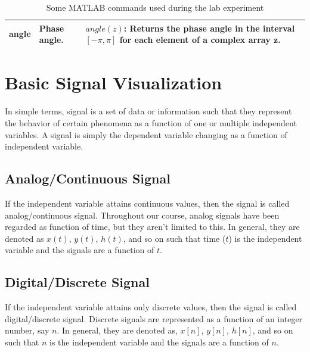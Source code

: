 \documentclass{lab_sheet}
\begin{document}
\begin{table}[H]
\begin{tabular}{||C{3cm}||C{4cm}||C{7.5cm}||}
    angle   & Phase angle.                                & $angle(z)$: Returns the phase angle in the interval $[-\pi,\pi]$ for each element of a complex array z.          
    \\                                                                                             
        \bottomrule
        \end{tabular}
        \label{tbl:matlab_commands}
        \caption{Some MATLAB commands used during the lab experiment}
  \end{table}
    \section{Basic Signal Visualization}
    In simple terms, signal is a set of data or information such that they represent the behavior of certain phenomena as a function of one or multiple independent variables. A signal is simply the dependent variable changing as a function of independent variable.
    \subsection*{Analog/Continuous Signal}
    If the independent variable attains continuous values, then the signal is called analog/continuous signal. Throughout our course, analog signals have been regarded as function of time, but they aren't limited to this. In general, they are denoted as $x(t)$, $y(t)$, $h(t)$, and so on such that time ($t$) is the independent variable and the signals are a function of $t$. 
    \subsection*{Digital/Discrete Signal}
    If the independent variable attains only discrete values, then the signal is called digital/discrete signal. Discrete signals are represented as a function of an integer number, say $n$. In general, they are denoted as, $x[n]$, $y[n]$, $h[n]$, and so on such that $n$ is the independent variable and the signals are a function of $n$.
\end{document}

